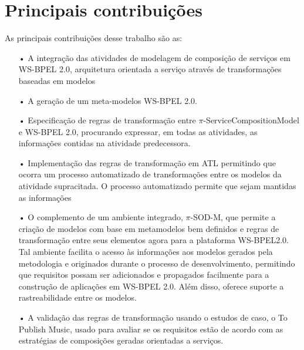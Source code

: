 \section{Principais contribuições}
\label{contributions}

As principais contribuições desse trabalho são as:

\begin{itemize}

\item[•] A integração das atividades de modelagem de composição de serviços em WS-BPEL 2.0, arquitetura orientada a serviço através de transformações baseadas em modelos

\item[•] A geração de um meta-modelos WS-BPEL 2.0.

\item[•] Especificação de regras de transformação entre $\pi$-ServiceCompositionModel e
WS-BPEL 2.0, procurando expressar, em todas as atividades, as informações contidas na atividade predecessora.

\item[•] Implementação das regras de transformação em ATL permitindo que ocorra um processo automatizado de transformações entre os modelos da atividade supracitada. O processo automatizado permite que sejam mantidas as informações

\item[•] O complemento de um ambiente integrado, $\pi$-SOD-M, que permite a criação de modelos com base em metamodelos bem definidos e regras de transformação entre seus elementos agora para a plataforma WS-BPEL2.0. Tal ambiente facilita o acesso às informações aos modelos gerados pela metodologia e originados durante o processo de desenvolvimento, permitindo que requisitos possam ser adicionados e propagados facilmente para a construção de aplicações em WS-BPEL 2.0. Além disso, oferece
suporte a rastreabilidade entre os modelos.

\item[•] A validação das regras de transformação usando o estudos de caso, o To Publish Music, usado para avaliar se os requisitos estão de acordo com as estratégias de composições geradas orientadas a serviços.

\end{itemize}


